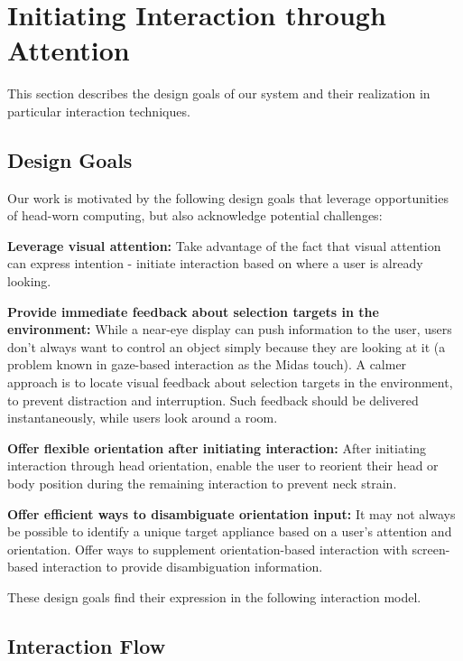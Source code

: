 \documentclass{sigchi}
\begin{document}
\section{Initiating Interaction through Attention}
This section describes the design goals of our system and their realization in particular interaction techniques.

\subsection{Design Goals}
Our work is motivated by the following design goals that leverage opportunities of head-worn computing, but also acknowledge potential challenges:

{\bf Leverage visual attention:} Take advantage of the fact that visual attention can express intention - initiate interaction based on where a user is already looking. 

{\bf Provide immediate feedback about selection targets in the environment:} While a near-eye display can push information to the user, users don't always want to control an object simply because they are looking at it (a problem known in gaze-based interaction as the Midas touch). A calmer~\cite{weiser_coming_1997} approach is to locate visual feedback about selection targets in the environment, to prevent distraction and interruption. Such feedback should be delivered instantaneously, while users look around a room.

{\bf Offer flexible orientation after initiating interaction:} After initiating interaction through head orientation, enable the user to reorient their head or body position during the remaining interaction to prevent neck strain.

{\bf Offer efficient ways to disambiguate orientation input:} It may not always be possible to identify a unique target appliance based on a user's attention and orientation. Offer ways to supplement orientation-based interaction with screen-based interaction to provide disambiguation information.

These design goals find their expression in the following interaction model.

\subsection{Interaction Flow}
\end{document}
